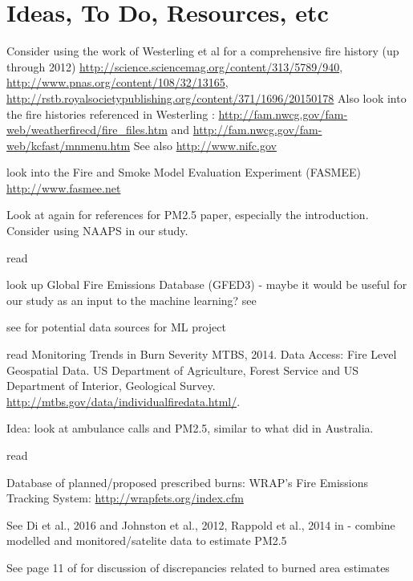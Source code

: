 \section{Ideas, To Do, Resources, etc}

Consider using the work of Westerling et al for a comprehensive fire history (up through 2012) \url{http://science.sciencemag.org/content/313/5789/940}, \url{http://www.pnas.org/content/108/32/13165}, \url{http://rstb.royalsocietypublishing.org/content/371/1696/20150178} \cite{westerling_increasing_2016,WesterlingCorrection2016} Also look into the fire histories referenced in Westerling \cite{westerling_increasing_2016,WesterlingCorrection2016}: \url{http://fam.nwcg.gov/fam-web/weatherfirecd/fire_files.htm} and \url{http://fam.nwcg.gov/fam-web/kcfast/mnmenu.htm} See also \url{http://www.nifc.gov}

look into the Fire and Smoke Model Evaluation Experiment (FASMEE) \url{http://www.fasmee.net}

Look at \cite{kollanus_effects_2016} again for references for PM2.5 paper, especially the introduction. Consider using NAAPS in our study. 

read \cite{mcclure_US_2018}

look up Global Fire Emissions Database (GFED3) - maybe it would be useful for our study as an input to the machine learning? see \cite{liu_wildfire-specific_2016}

see \cite{alman_association_2016} for potential data sources for ML project

read Monitoring Trends in Burn Severity MTBS, 2014. Data Access: Fire Level Geospatial
Data. US Department of Agriculture, Forest Service and US Department of
Interior, Geological Survey. \url{http://mtbs.gov/data/individualfiredata.html/}.

Idea: look at ambulance calls and PM2.5, similar to what \cite{salimi_ambient_2016} did in Australia.

read \cite{williamson_transdisciplinary_2016}

Database of planned/proposed prescribed burns: WRAP's Fire Emissions Tracking System: \url{http://wrapfets.org/index.cfm}

See Di et al., 2016 and Johnston et al., 2012, Rappold et al., 2014 in \cite{jones_application_2017} - combine modelled and monitored/satelite data to estimate PM2.5

See page 11 of \cite{hyde_air_2017} for discussion of discrepancies related to burned area estimates

